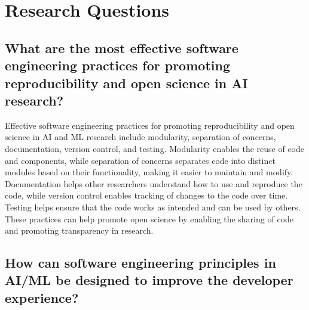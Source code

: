 
\section{Research Questions}


\subsection{
    What are the most effective software engineering practices for promoting reproducibility and open science in AI research?}
    Effective software engineering practices for promoting reproducibility and open science in AI and ML research include modularity, separation of concerns, documentation, version control, and testing. Modularity enables the reuse of code and components, while separation of concerns separates code into distinct modules based on their functionality, making it easier to maintain and modify. Documentation helps other researchers understand how to use and reproduce the code, while version control enables tracking of changes to the code over time. Testing helps ensure that the code works as intended and can be used by others. These practices can help promote open science by enabling the sharing of code and promoting transparency in research.
    
    
    
\subsection{
How can software engineering principles in AI/ML be designed to improve the developer experience?
}

